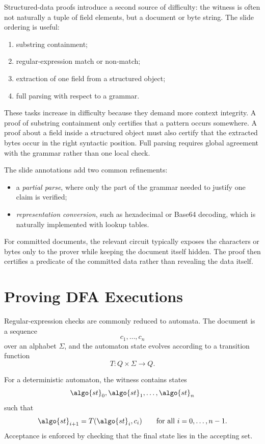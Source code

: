 \documentclass[11pt]{article}
\begin{document}
Structured-data proofs introduce a second source of difficulty: the witness is
often not naturally a tuple of field elements, but a document or byte string.
The slide ordering is useful:
\begin{enumerate}
  \item substring containment;
  \item regular-expression match or non-match;
  \item extraction of one field from a structured object;
  \item full parsing with respect to a grammar.
\end{enumerate}

These tasks increase in difficulty because they demand more context integrity.
A proof of substring containment only certifies that a pattern occurs
somewhere.  A proof about a field inside a structured object must also certify
that the extracted bytes occur in the right syntactic position.  Full parsing
requires global agreement with the grammar rather than one local check.

The slide annotations add two common refinements:
\begin{itemize}
  \item a \emph{partial parse}, where only the part of the grammar needed to
        justify one claim is verified;
  \item \emph{representation conversion}, such as hexadecimal or Base64
        decoding, which is naturally implemented with lookup tables.
\end{itemize}

For committed documents, the relevant circuit typically exposes the characters
or bytes only to the prover while keeping the document itself hidden.  The
proof then certifies a predicate of the committed data rather than revealing
the data itself.

\section{Proving DFA Executions}

Regular-expression checks are commonly reduced to automata.  The document is a
sequence
\[
  c_1,\ldots,c_n
\]
over an alphabet $\Sigma$, and the automaton state evolves according to a
transition function
\[
  T : Q \times \Sigma \to Q.
\]

For a deterministic automaton, the witness contains states
\[
  \algo{st}_0,\algo{st}_1,\ldots,\algo{st}_n
\]
such that
\[
  \algo{st}_{i+1}=T(\algo{st}_i,c_i)
  \qquad\text{for all } i=0,\ldots,n-1.
\]
Acceptance is enforced by checking that the final state lies in the accepting
set.
\end{document}
